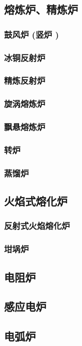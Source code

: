 \documentclass[UTF8]{../../ApplicationUniverse}
\begin{document}
    \subsection{熔炼炉、精炼炉}
        \subsubsection{鼓风炉 (竖炉 )}
        \subsubsection{冰铜反射炉}
        \subsubsection{精炼反射炉}
        \subsubsection{旋涡熔炼炉}
        \subsubsection{飘悬熔炼炉}
        \subsubsection{转炉}
        \subsubsection{蒸馏炉}
    \subsection{火焰式熔化炉}
        \subsubsection{反射式火焰熔化炉}
        \subsubsection{坩埚炉}
    \subsection{电阻炉}
    \subsection{感应电炉}
    \subsection{电弧炉}
\end{document}
